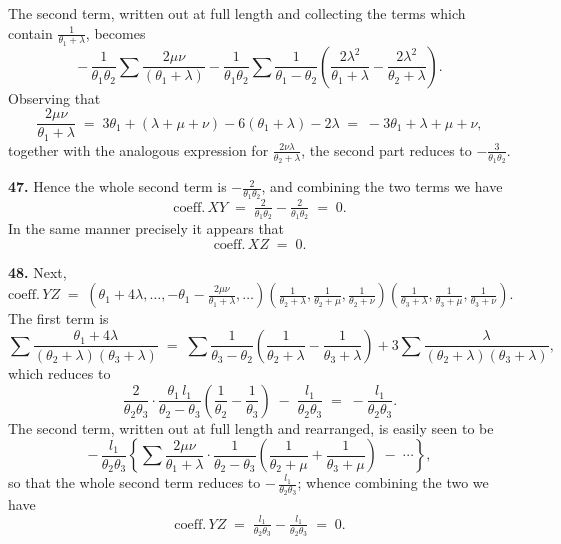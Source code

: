 \documentclass[11pt,a4paper]{article}
\begin{document}
\medskip

The second term, written out at full length and collecting the terms which contain $\tfrac{1}{\theta_{1}+\lambda}$, becomes
\[
-\,\frac{1}{\theta_{1}\theta_{2}}\sum\frac{2\mu\nu}{(\theta_{1}+\lambda)} - \frac{1}{\theta_{1}\theta_{2}}\sum\frac{1}{\theta_{1}-\theta_{2}}\!\left(\frac{2\lambda^{2}}{\theta_{1}+\lambda}-\frac{2\lambda^{2}}{\theta_{2}+\lambda}\right).
\]
Observing that
\[
\frac{2\mu\nu}{\theta_{1}+\lambda} \;=\; 3\theta_{1} + (\lambda+\mu+\nu) - 6(\theta_{1}+\lambda) - 2\lambda \;=\; -3\theta_{1} + \lambda+\mu+\nu,
\]
together with the analogous expression for $\tfrac{2\nu\lambda}{\theta_{2}+\lambda}$, the second part reduces to $-\tfrac{3}{\theta_{1}\theta_{2}}$.

\medskip

\textbf{47.} Hence the whole second term is $-\tfrac{2}{\theta_{1}\theta_{2}}$, and combining the two terms we have
\[
\text{coeff.}\, XY \;=\; \tfrac{2}{\theta_{1}\theta_{2}} - \tfrac{2}{\theta_{1}\theta_{2}} \;=\; 0.
\]
In the same manner precisely it appears that
\[
\text{coeff.}\, XZ \;=\; 0.
\]

\medskip

\textbf{48.} Next,
\[
\text{coeff.}\, YZ \;=\; (\theta_{1}+4\lambda,\ldots,-\theta_{1}-\tfrac{2\mu\nu}{\theta_{1}+\lambda},\ldots)\!\left(\tfrac{1}{\theta_{2}+\lambda},\tfrac{1}{\theta_{2}+\mu},\tfrac{1}{\theta_{2}+\nu}\right)\!\left(\tfrac{1}{\theta_{3}+\lambda},\tfrac{1}{\theta_{3}+\mu},\tfrac{1}{\theta_{3}+\nu}\right).
\]
The first term is
\[
\sum\frac{\theta_{1}+4\lambda}{(\theta_{2}+\lambda)(\theta_{3}+\lambda)} \;=\; \sum\frac{1}{\theta_{3}-\theta_{2}}\!\left(\frac{1}{\theta_{2}+\lambda}-\frac{1}{\theta_{3}+\lambda}\right) + 3\sum\frac{\lambda}{(\theta_{2}+\lambda)(\theta_{3}+\lambda)},
\]
which reduces to
\[
\frac{2}{\theta_{2}\theta_{3}}\cdot\frac{\theta_{1}\,l_{1}}{\theta_{2}-\theta_{3}}\!\left(\frac{1}{\theta_{2}}-\frac{1}{\theta_{3}}\right) \;-\; \frac{l_{1}}{\theta_{2}\theta_{3}} \;=\; -\frac{l_{1}}{\theta_{2}\theta_{3}}.
\]
The second term, written out at full length and rearranged, is easily seen to be
\[
-\,\frac{l_{1}}{\theta_{2}\theta_{3}}\!\left\{\sum\frac{2\mu\nu}{\theta_{1}+\lambda}\cdot\frac{1}{\theta_{2}-\theta_{3}}\!\left(\frac{1}{\theta_{2}+\mu}+\frac{1}{\theta_{3}+\mu}\right)\;-\;\cdots\right\},
\]
so that the whole second term reduces to $-\,\tfrac{l_{1}}{\theta_{2}\theta_{3}}$; whence combining the two we have
\[
\text{coeff.}\, YZ \;=\; \tfrac{l_{1}}{\theta_{2}\theta_{3}} - \tfrac{l_{1}}{\theta_{2}\theta_{3}} \;=\; 0.
\]
\end{document}
